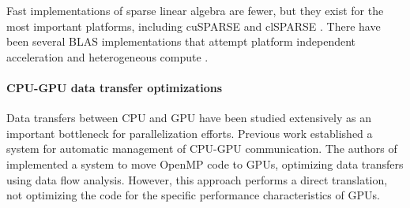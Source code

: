 Fast implementations of sparse linear algebra are fewer, but they exist for the
most important platforms, including cuSPARSE \cite{cusparse} and clSPARSE
\cite{clsparse}.
There have been several BLAS implementations that attempt platform independent
acceleration and heterogeneous compute \cite{Wang:2016:BHP:2925426.2926256,
10.1007/978-3-319-64203-1_33, Diego2017Multi}. 



\paragraph{CPU-GPU data transfer optimizations}
Data transfers between CPU and GPU have been studied extensively as an important
bottleneck for parallelization efforts.
Previous work \cite{Jablin:2011:ACC:1993316.1993516} established a system for
automatic management of CPU-GPU communication.
The authors of \cite{Lee:2009:OGC:1594835.1504194} implemented a system to
move OpenMP code to GPUs, optimizing data transfers using data flow analysis.
However, this approach performs a direct translation, not optimizing the code
for the specific performance characteristics of GPUs.



